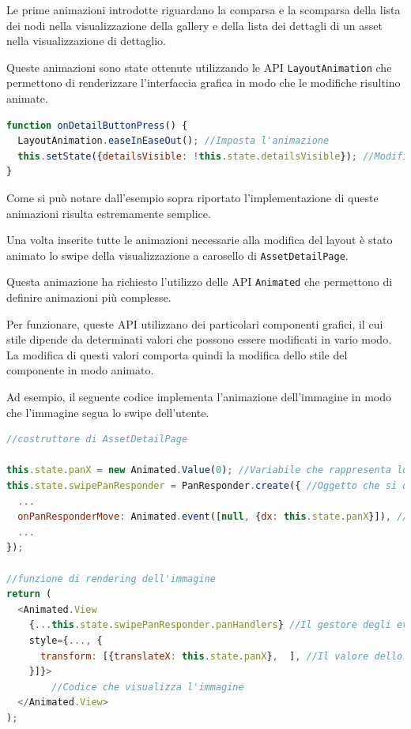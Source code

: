 Le prime animazioni introdotte riguardano la comparsa e la scomparsa della lista dei nodi nella visualizzazione della gallery e della lista dei dettagli di un asset nella visualizzazione di dettaglio.

Queste animazioni sono state ottenute utilizzando le API \texttt{LayoutAnimation} che permettono di renderizzare l'interfaccia grafica in modo che le modifiche risultino animate.

\begin{lstlisting}[language=JavaScript, caption=AssetDetailPage - Animazione della comparsa/scomparsa lista dei dettagli]
function onDetailButtonPress() {
  LayoutAnimation.easeInEaseOut(); //Imposta l'animazione
  this.setState({detailsVisible: !this.state.detailsVisible}); //Modifica lo stato del componente causandone il re-rendering
}
\end{lstlisting}

Come si può notare dall'esempio sopra riportato l'implementazione di queste animazioni risulta estremamente semplice.

Una volta inserite tutte le animazioni necessarie alla modifica del layout è stato animato lo swipe della visualizzazione a carosello di \texttt{AssetDetailPage}.

Questa animazione ha richiesto l'utilizzo delle API \texttt{Animated} che permettono di definire animazioni più complesse.

Per funzionare, queste API utilizzano dei particolari componenti grafici, il cui stile dipende da determinati valori che possono essere modificati in vario modo. La modifica di questi valori comporta quindi la modifica dello stile del componente in modo animato.

Ad esempio, il seguente codice implementa l'animazione dell'immagine in modo che l'immagine segua lo swipe dell'utente.

\begin{lstlisting}[language=JavaScript, caption=AssetDetailImage - Spostamento dell'immagine allo swipe delll'utente]
//costruttore di AssetDetailPage

this.state.panX = new Animated.Value(0); //Variabile che rappresenta lo spostamento dell'immagine
this.state.swipePanResponder = PanResponder.create({ //Oggetto che si occupa di rilevare le gesture dell'utente
  ...
  onPanResponderMove: Animated.event([null, {dx: this.state.panX}]), //All'evento onPanResponderMove, che viene sollevato quando l'utente esegue un pan (equivalente del drag'n'drop nei dispositivi touchscreen) viene collegata la variabile panX, in modo che il valore della variabile venga modificato e che la modifica venga effettuata in modo animato
  ...
});

//funzione di rendering dell'immagine
return (
  <Animated.View
    {...this.state.swipePanResponder.panHandlers} //Il gestore degli eventi viene collegato alla View
    style={..., {
      transform: [{translateX: this.state.panX},  ], //Il valore dello spostamento viene associato allo stile della View, in particolare alla traslazione sull'asse X
    }]}>
    	//Codice che visualizza l'immagine
  </Animated.View>
);
\end{lstlisting}

